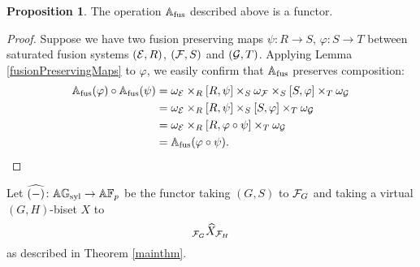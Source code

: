 \documentclass[10pt]{amsart}
\theoremstyle{definition}
\newtheorem{proposition}[theorem]{Proposition}
\renewcommand{\phi}{\varphi}
\begin{document}
\begin{proposition}\label{ApFunctor}
The operation $\mathbb{A}_{\text{fus}}$ described above is a functor.
\end{proposition}

\begin{proof}
Suppose we have two fusion preserving maps $\psi\colon R\to S$, $\phi\colon S\to T$ between saturated fusion systems $(\mathcal{E},R)$, $(\mathcal{F},S)$ and $(\mathcal{G},T)$. Applying Lemma \ref{fusionPreservingMaps} to $\phi$, we easily confirm that $\mathbb{A}_{\text{fus}}$ preserves composition:
\begin{align*}
\Af(\phi) \circ \Af(\psi) &= \omega_\cE \times_R [R,\psi] \times_S \omega_\cF \times_S [S,\phi] \times_T \omega_\cG
\\ &= \omega_\cE \times_R [R,\psi] \times_S [S,\phi] \times_T \omega_\cG
\\ &= \omega_\cE \times_R [R,\phi\circ \psi] \times_T \omega_\cG
\\ &= \Af(\phi\circ \psi).\qedhere
\end{align*}
\end{proof}

Let $\widehat{(-)} \colon \mathbb{A} \mathbb{G}_{\text{syl}} \rightarrow \mathbb{A} \mathbb{F}_p$ be the functor taking $(G, S)$ to $\mathcal{F}_{G}$ and taking a virtual $(G,H)$-biset $X$ to
\[
{}_{\mathcal{F}_G}\widehat{X}_{\mathcal{F}_H}
\]
as described in Theorem \ref{mainthm}.
\end{document}
